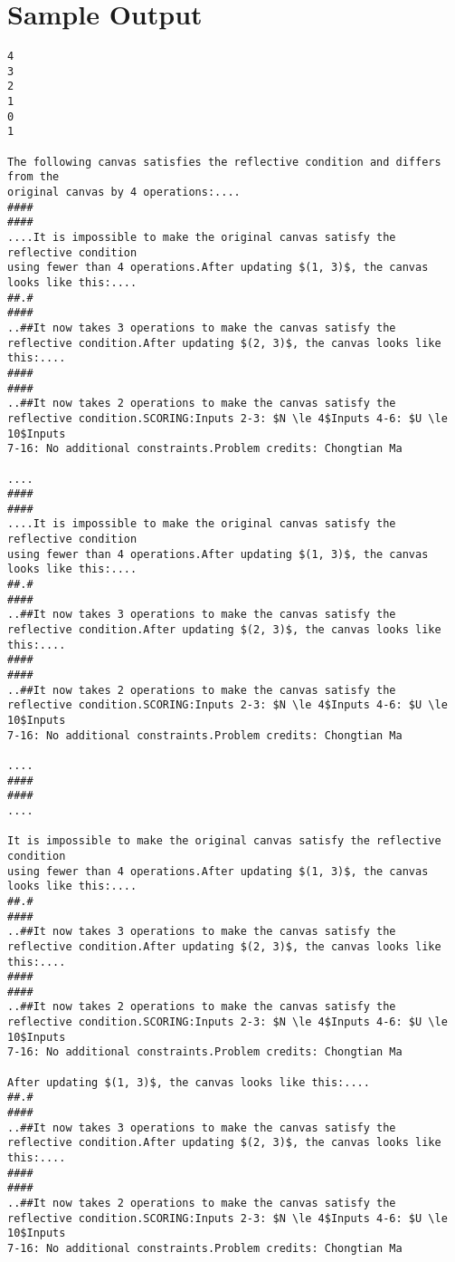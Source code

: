 \documentclass[12pt]{article}
\begin{document}
\section*{Sample Output}
\begin{verbatim}
4
3
2
1
0
1

The following canvas satisfies the reflective condition and differs from the
original canvas by 4 operations:....
####
####
....It is impossible to make the original canvas satisfy the reflective condition
using fewer than 4 operations.After updating $(1, 3)$, the canvas looks like this:....
##.#
####
..##It now takes 3 operations to make the canvas satisfy the reflective condition.After updating $(2, 3)$, the canvas looks like this:....
####
####
..##It now takes 2 operations to make the canvas satisfy the reflective condition.SCORING:Inputs 2-3: $N \le 4$Inputs 4-6: $U \le 10$Inputs
7-16: No additional constraints.Problem credits: Chongtian Ma

....
####
####
....It is impossible to make the original canvas satisfy the reflective condition
using fewer than 4 operations.After updating $(1, 3)$, the canvas looks like this:....
##.#
####
..##It now takes 3 operations to make the canvas satisfy the reflective condition.After updating $(2, 3)$, the canvas looks like this:....
####
####
..##It now takes 2 operations to make the canvas satisfy the reflective condition.SCORING:Inputs 2-3: $N \le 4$Inputs 4-6: $U \le 10$Inputs
7-16: No additional constraints.Problem credits: Chongtian Ma

....
####
####
....

It is impossible to make the original canvas satisfy the reflective condition
using fewer than 4 operations.After updating $(1, 3)$, the canvas looks like this:....
##.#
####
..##It now takes 3 operations to make the canvas satisfy the reflective condition.After updating $(2, 3)$, the canvas looks like this:....
####
####
..##It now takes 2 operations to make the canvas satisfy the reflective condition.SCORING:Inputs 2-3: $N \le 4$Inputs 4-6: $U \le 10$Inputs
7-16: No additional constraints.Problem credits: Chongtian Ma

After updating $(1, 3)$, the canvas looks like this:....
##.#
####
..##It now takes 3 operations to make the canvas satisfy the reflective condition.After updating $(2, 3)$, the canvas looks like this:....
####
####
..##It now takes 2 operations to make the canvas satisfy the reflective condition.SCORING:Inputs 2-3: $N \le 4$Inputs 4-6: $U \le 10$Inputs
7-16: No additional constraints.Problem credits: Chongtian Ma


\end{verbatim}
\end{document}

